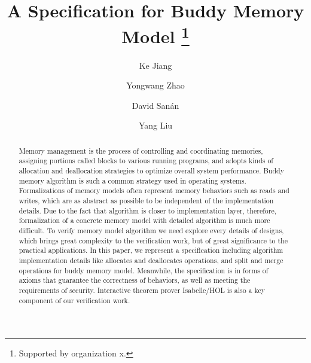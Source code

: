 \documentclass[runningheads]{llncs}
\begin{document}
\title{A Specification for Buddy Memory Model
		\thanks{Supported by organization x.}}



\author{Ke Jiang \and
		Yongwang Zhao \and
		David San\'{a}n \and
		Yang Liu}




\maketitle              


\begin{abstract}
Memory management is the process of controlling and coordinating memories, assigning portions called blocks to various running programs, and adopts kinds of allocation and deallocation strategies to optimize overall system performance. Buddy memory algorithm is such a common strategy used in operating systems. Formalizations of memory models often represent memory behaviors such as reads and writes, which are as abstract as possible to be independent of the implementation details. Due to the fact that algorithm is closer to implementation layer, therefore, formalization of a concrete memory model with detailed algorithm is much more difficult. To verify memory model algorithm we need explore every details of designs, which brings great complexity to the verification work, but of great significance to the practical applications. In this paper, we represent a specification including algorithm implementation details like allocates and deallocates operations, and split and merge operations for buddy memory model. Meanwhile, the specification is in forms of axioms that guarantee the correctness of behaviors, as well as meeting the requirements of security. Interactive theorem prover Isabelle/HOL is also a key component of our verification work.

\end{abstract}
\end{document}
